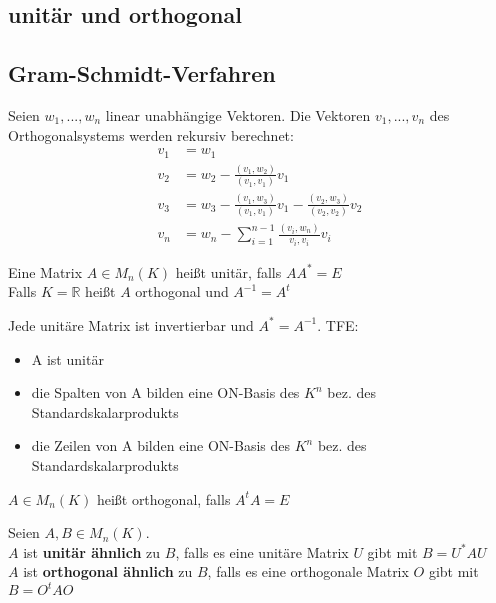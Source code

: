 \subsection{unitär und orthogonal}

\subsection{Gram-Schmidt-Verfahren}

\begin{theorem}
Seien $w_1,...,w_n$ linear unabhängige Vektoren. Die Vektoren $v_1,...,v_n$ des Orthogonalsystems werden rekursiv berechnet:
\begin{align*}
v_1 &= w_1\\
v_2 &= w_2 - \frac{(v_1,w_2)}{(v_1,v_1)}v_1\\
v_3 &= w_3 - \frac{(v_1,w_3)}{(v_1,v_1)}v_1 - \frac{(v_2,w_3)}{(v_2,v_2)}v_2\\
v_n &= w_n - \sum_{i=1}^{n-1}\frac{(v_i,w_n)}{v_i,v_i}v_i
\end{align*}
\end{theorem}

\begin{definition}
Eine Matrix $A \in M_n(K)$ heißt unitär, falls $AA^* = E$\\
Falls $K = \mathbb{R}$ heißt $A$ orthogonal und $A^{-1} = A^t$
\end{definition}
\begin{theorem}
Jede unitäre Matrix ist invertierbar und $A^* = A^{-1}$. TFE:
\begin{itemize}
	\item A ist unitär
	\item die Spalten von A bilden eine ON-Basis des $K^n$ bez. des Standardskalarprodukts
	\item die Zeilen von A bilden eine ON-Basis des $K^n$ bez. des Standardskalarprodukts
\end{itemize}
\end{theorem}

\begin{definition}
$A \in M_n(K)$ heißt orthogonal, falls $A^tA = E$
\end{definition}

\begin{definition}
Seien $A, B \in M_n(K)$.\\
$A$ ist \textbf{unitär ähnlich} zu $B$, falls es eine unitäre Matrix $U$ gibt mit $B = U^*AU$\\
$A$ ist \textbf{orthogonal ähnlich} zu $B$, falls es eine orthogonale Matrix $O$ gibt mit $B = O^tAO$
\end{definition}

